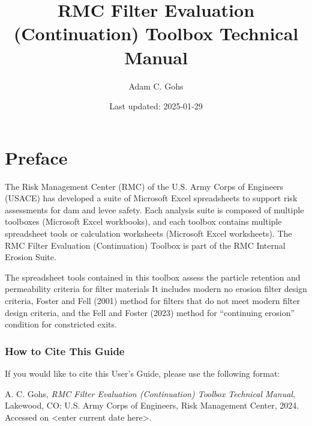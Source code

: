 \documentclass[
]{book}
\title{RMC Filter Evaluation (Continuation) Toolbox Technical Manual}
\author{Adam C. Gohs}
\date{Last updated: 2025-01-29}
\newenvironment{citation-note}
    {\begin{quote}\itshape}
    {\end{quote}}
\begin{document}
\maketitle

{
\setcounter{tocdepth}{1}
\tableofcontents
}
\chapter*{Preface}\label{preface}

The Risk Management Center (RMC) of the U.S. Army Corps of Engineers (USACE) has developed a suite of Microsoft Excel spreadsheets to support risk assessments for dam and levee safety. Each analysis suite is composed of multiple toolboxes (Microsoft Excel workbooks), and each toolbox contains multiple spreadsheet tools or calculation worksheets (Microsoft Excel worksheets). The RMC Filter Evaluation (Continuation) Toolbox is part of the RMC Internal Erosion Suite.

The spreadsheet tools contained in this toolbox assess the particle retention and permeability criteria for filter materials It includes modern no erosion filter design criteria, Foster and Fell (2001) method for filters that do not meet modern filter design criteria, and the Fell and Foster (2023) method for ``continuing erosion'' condition for constricted exits.

\subsection*{How to Cite This Guide}\label{how-to-cite-this-guide}

If you would like to cite this User's Guide, please use the following format:

\begin{citation-note}
A. C. Gohs, \emph{RMC Filter Evaluation (Continuation) Toolbox Technical
Manual}, Lakewood, CO: U.S. Army Corps of Engineers, Risk Management
Center, 2024. Accessed on {\textless enter current date
here\textgreater{}}.
\end{citation-note}

  
\end{document}
